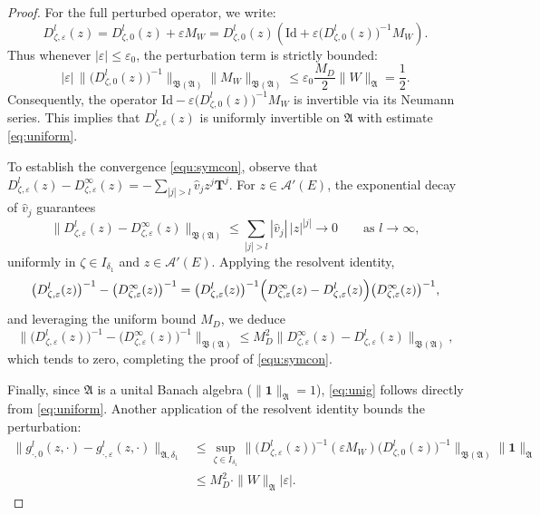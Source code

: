 \documentclass[reqno,11pt]{amsart}
\begin{document}
\begin{proof}
For the full perturbed operator, we write:
$$
D^{l}_{\zeta,\varepsilon}(z) = D^{l}_{\zeta,0}(z)+\varepsilon M_W = D^{l}_{\zeta,0}(z)\left(\mathrm{Id}+\varepsilon \bigl(D^{l}_{\zeta,0}(z)\bigr)^{-1}M_W\right).
$$
Thus  whenever $|\varepsilon| \le \varepsilon_0$, the perturbation term is strictly bounded:
$$
|\varepsilon|\, \bigl\|\bigl(D_{\zeta,0}^{l}(z)\bigr)^{-1}\bigr\|_{\mathfrak{B}(\mathfrak A)} \|M_W\|_{\mathfrak{B}(\mathfrak A)} \le \varepsilon_0 \frac{M_D}{2} \|W\|_{\mathfrak A} = \frac{1}{2}.
$$
Consequently, the operator $\mathrm{Id}-\varepsilon \bigl(D^{l}_{\zeta,0}(z)\bigr)^{-1}M_W$ is invertible via its Neumann series. This implies that $D^{l}_{\zeta,\varepsilon}(z)$ is uniformly invertible on $\mathfrak A$ with estimate \eqref{eq:uniform}.

To establish the convergence \eqref{equ:symcon}, observe that $D_{\zeta,\varepsilon}^{l}(z) - D_{\zeta,\varepsilon}^{\infty}(z) = -\sum_{|j|>l} \hat v_j z^j \mathbf T^j$. For $z\in\mathcal A'(E)$, the exponential decay of $\hat v_j$ guarantees
$$
\bigl\| D_{\zeta,\varepsilon}^{l}(z) - D_{\zeta,\varepsilon}^{\infty}(z) \bigr\|_{\mathfrak{B}(\mathfrak A)}
\le
\sum_{|j|>l}|\hat v_j|\,|z|^{|j|} \to 0 \qquad \text{as } l \to \infty,
$$ 
uniformly in $\zeta\in I_{\delta_1}$ and $z\in\mathcal A'(E)$. Applying the resolvent identity,
$$
\bigl(D_{\zeta,\varepsilon}^{l}(z)\bigr)^{-1} - \bigl(D_{\zeta,\varepsilon}^{\infty}(z)\bigr)^{-1}=
\bigl(D_{\zeta,\varepsilon}^{l}(z)\bigr)^{-1}
\Bigl(D_{\zeta,\varepsilon}^{\infty}(z) - D_{\zeta,\varepsilon}^{l}(z)\Bigr)
\bigl(D_{\zeta,\varepsilon}^{\infty}(z)\bigr)^{-1},
$$
and leveraging the uniform bound $M_D$, we deduce
$$
\bigl\| \bigl(D_{\zeta,\varepsilon}^{l}(z)\bigr)^{-1} - \bigl(D_{\zeta,\varepsilon}^{\infty}(z)\bigr)^{-1} \bigr\|_{\mathfrak{B}(\mathfrak A)} 
\le M_D^2 \bigl\| D_{\zeta,\varepsilon}^{\infty}(z) - D_{\zeta,\varepsilon}^{l}(z) \bigr\|_{\mathfrak{B}(\mathfrak A)},
$$
which tends to zero, completing the proof of \eqref{equ:symcon}.

Finally, since $\mathfrak A$ is a unital Banach algebra ($\|\mathbf{1}\|_{\mathfrak A}=1$),  \eqref{eq:unig} follows directly  from  \eqref{eq:uniform}.
Another application of the resolvent identity bounds the perturbation:
\begin{align*}
\|g^{l}_{\cdot,0}(z,\cdot)-g^{l}_{\cdot,\varepsilon}(z,\cdot)\|_{\mathfrak A,\delta_1} 
&\le \sup_{\zeta\in I_{\delta_1}} \bigl\|\bigl(D^{l}_{\zeta,\varepsilon}(z)\bigr)^{-1} (\varepsilon M_W) \bigl(D^{l}_{\zeta,0}(z)\bigr)^{-1}\bigr\|_{\mathfrak{B}(\mathfrak A)} \|\mathbf{1}\|_{\mathfrak A} \\
&\le M_D^2 \cdot \|W\|_{\mathfrak A} |\varepsilon| .
\end{align*}
\end{proof}
\end{document}
